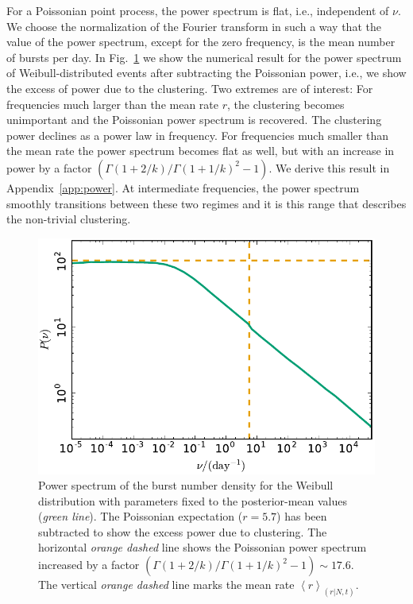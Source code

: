 \documentclass[fleqn,usenatbib]{mnras}
\newcommand{\new}[1]{#1}
\begin{document}
\new{For a Poissonian point process, the power spectrum is flat, i.e., independent of $\nu$. We choose the normalization of the Fourier transform in such a way that the value of the power spectrum, except for the zero frequency, is the mean number of bursts per day. In Fig.~\ref{fig:powspec} we show the numerical result for the power spectrum of Weibull-distributed events after subtracting the Poissonian power, i.e., we show the excess of power due to the clustering. Two extremes are of interest: For frequencies much larger than the mean rate $r$, the clustering becomes unimportant and the Poissonian power spectrum is recovered. The clustering power declines as a power law in frequency. For frequencies much smaller than the mean rate the power spectrum becomes flat as well, but with an increase in power by a factor $(\Gamma(1 + 2/k)/\Gamma(1 + 1/k)^2 - 1)$. We derive this result in Appendix~\ref{app:power}. At intermediate frequencies, the power spectrum smoothly transitions between these two regimes and it is this range that describes the non-trivial clustering.}

\begin{figure}
	\includegraphics[width=1.0\columnwidth]{powspec_weibull.pdf}
	\caption{\label{fig:powspec}\new{Power spectrum of the burst number density for the Weibull distribution with parameters fixed to the posterior-mean values (\emph{green line}). The Poissonian expectation ($r=5.7$) has been subtracted to show the excess power due to clustering. The horizontal \emph{orange dashed} line shows the Poissonian power spectrum increased by a factor $(\Gamma(1 + 2/k)/\Gamma(1 + 1/k)^2 - 1)\sim 17.6$. The vertical \emph{orange dashed} line marks the mean rate $\left<r\right>_{(r|N,t)}$.}}
\end{figure}
\end{document}
